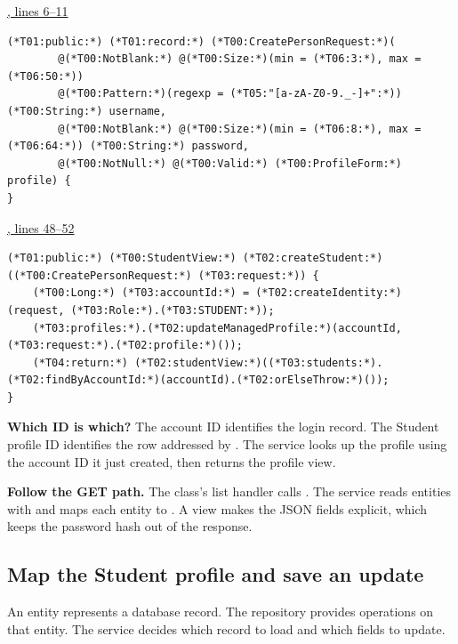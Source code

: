 \par\smallskip
{\small\href{\repo/blob/5d22aed7f6d4ef1e4c0b0c0dabf2962ba4b47608/src/main/java/com/example/fmschool/dto/CreatePersonRequest.java#L6-L11}{, lines 6--11}}
\begin{lstlisting}[style=vsJava,firstnumber=6]
(*T01:public:*) (*T01:record:*) (*T00:CreatePersonRequest:*)(
        @(*T00:NotBlank:*) @(*T00:Size:*)(min = (*T06:3:*), max = (*T06:50:*))
        @(*T00:Pattern:*)(regexp = (*T05:"[a-zA-Z0-9._-]+":*)) (*T00:String:*) username,
        @(*T00:NotBlank:*) @(*T00:Size:*)(min = (*T06:8:*), max = (*T06:64:*)) (*T00:String:*) password,
        @(*T00:NotNull:*) @(*T00:Valid:*) (*T00:ProfileForm:*) profile) {
}
\end{lstlisting}

\par\smallskip
{\small\href{\repo/blob/5d22aed7f6d4ef1e4c0b0c0dabf2962ba4b47608/src/main/java/com/example/fmschool/service/PeopleApiService.java#L48-L52}{, lines 48--52}}
\begin{lstlisting}[style=vsJava,firstnumber=48]
(*T01:public:*) (*T00:StudentView:*) (*T02:createStudent:*)((*T00:CreatePersonRequest:*) (*T03:request:*)) {
    (*T00:Long:*) (*T03:accountId:*) = (*T02:createIdentity:*)(request, (*T03:Role:*).(*T03:STUDENT:*));
    (*T03:profiles:*).(*T02:updateManagedProfile:*)(accountId, (*T03:request:*).(*T02:profile:*)());
    (*T04:return:*) (*T02:studentView:*)((*T03:students:*).(*T02:findByAccountId:*)(accountId).(*T02:orElseThrow:*)());
}
\end{lstlisting}


\textbf{Which ID is which?}
The account ID identifies the login record. The Student profile ID identifies the
row addressed by . The service looks up the profile using
the account ID it just created, then returns the profile view.

\textbf{Follow the GET path.}
The class's list handler calls . The service reads
entities with  and maps each entity to . A view
makes the JSON fields explicit, which keeps the password hash out of the response.

\clearpage
\subsection{Map the Student profile and save an update}
An entity represents a database record. The repository provides operations on that
entity. The service decides which record to load and which fields to update.


